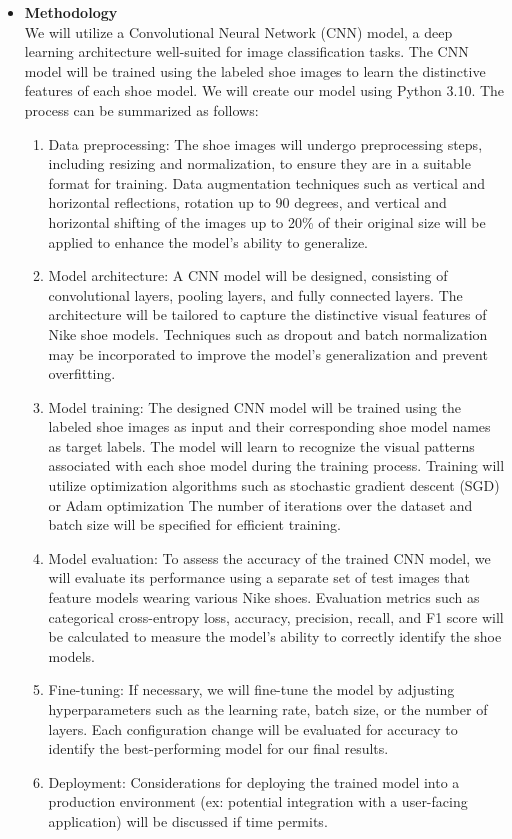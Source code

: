 \documentclass{article}
\begin{document}
\begin{itemize}
            \item[] \textbf{Methodology} \\
		We will utilize a Convolutional Neural Network (CNN) model, a deep learning architecture well-suited for image classification tasks. The CNN model will be trained using the labeled shoe images to learn the distinctive features of each shoe model. We will create our model using Python 3.10. The process can be summarized as follows: 
		\begin{enumerate}
			\item Data preprocessing: The shoe images will undergo preprocessing steps, including resizing and normalization, to ensure they are in a suitable format for training. Data augmentation techniques such as vertical and horizontal reflections, rotation up to 90 degrees, and vertical and horizontal shifting of the images up to 20\% of their original size will be applied to enhance the model's ability to generalize. 
			\item Model architecture: A CNN model will be designed, consisting of convolutional layers, pooling layers, and fully connected layers. The architecture will be tailored to capture the distinctive visual features of Nike shoe models. Techniques such as dropout and batch normalization may be incorporated to improve the model's generalization and prevent overfitting. 
			\item Model training: The designed CNN model will be trained using the labeled shoe images as input and their corresponding shoe model names as target labels. The model will learn to recognize the visual patterns associated with each shoe model during the training process. Training will utilize optimization algorithms such as stochastic gradient descent (SGD) or Adam optimization The number of iterations over the dataset and batch size will be specified for efficient training.
			\item Model evaluation: To assess the accuracy of the trained CNN model, we will evaluate its performance using a separate set of test images that feature models wearing various Nike shoes. Evaluation metrics such as categorical cross-entropy loss, accuracy, precision, recall, and F1 score will be calculated to measure the model's ability to correctly identify the shoe models.
			\item Fine-tuning: If necessary, we will fine-tune the model by adjusting hyperparameters such as the learning rate, batch size, or the number of layers. Each configuration change will be evaluated for accuracy to identify the best-performing model for our final results. 
			\item Deployment: Considerations for deploying the trained model into a production environment (ex: potential integration with a user-facing application) will be discussed if time permits. 
		\end{enumerate}
		

\end{itemize}
\end{document}
